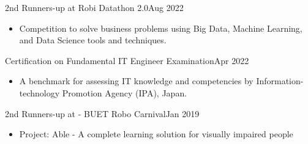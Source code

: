   \customSubHeadingContentStart
  
    \customSubHeading
      {2nd Runners-up at Robi Datathon 2.0}{Aug 2022}
      \begin{itemize}[itemsep=-3pt, left=0pt]
        \item {Competition to solve business problems using Big Data, Machine Learning, and Data Science tools and techniques.}
    \end{itemize}
    \vspace{-10pt}
      
      
    \customSubHeading
      {Certification on Fundamental IT Engineer Examination}{Apr 2022}
     \begin{itemize}[itemsep=-3pt, left=0pt]
        \item{ A benchmark for assessing IT knowledge and competencies by Information-technology Promotion Agency (IPA), Japan.}
    \end{itemize}
    \vspace{-10pt}

    \customSubHeading
      {2nd Runners-up at - BUET Robo Carnival}{Jan 2019}
    \begin{itemize}[itemsep=-3pt, left=0pt]
        \item{Project: Able - A complete learning solution for visually impaired people }
    \end{itemize}
    \vspace{-10pt}

  \customSubHeadingContentEnd
\vspace{-6pt}